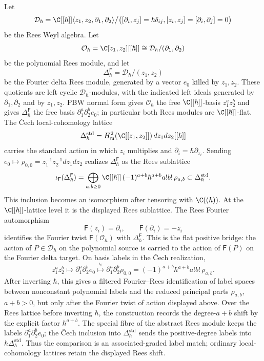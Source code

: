 \begin{thm}
\label{thm:app-matlis-rees-fourier-bridge}
  Let
  \[
    \mathcal D_\hbar
    =
    \C[[\hbar]]
      \langle z_1,z_2,\partial_1,\partial_2\rangle
      \big/
      \bigl([\partial_i,z_j]=\hbar\delta_{ij},
      [z_i,z_j]=[\partial_i,\partial_j]=0\bigr)
  \]
  be the Rees Weyl algebra.  Let
  \[
    \mathcal O_\hbar=\C[z_1,z_2][[\hbar]]
      \cong\mathcal D_\hbar/(\partial_1,\partial_2)
  \]
  be the polynomial Rees module, and let
  \[
    \Delta^{\mathsf F}_\hbar=
      \mathcal D_\hbar/(z_1,z_2)
  \]
  be the Fourier delta Rees module, generated by a vector \(e_0\)
  killed by \(z_1,z_2\).  These quotients are left cyclic
  \(\mathcal D_\hbar\)-modules, with the indicated left ideals
  generated by \(\partial_1,\partial_2\) and by \(z_1,z_2\). PBW normal
  form gives \(\mathcal O_\hbar\) the free \(\C[[\hbar]]\)-basis
  \(z_1^az_2^b\) and gives \(\Delta^{\mathsf F}_\hbar\) the free basis
  \(\partial_1^a\partial_2^b e_0\); in particular both Rees modules are
  \(\C[[\hbar]]\)-flat.  The \v{C}ech local-cohomology lattice
  \[
    \Delta^{\mathrm{std}}_\hbar=
    H^2_{\mathfrak m}(\C[[z_1,z_2]])\,dz_1dz_2[[\hbar]]
  \]
  carries the standard action in which \(z_i\) multiplies and
  \(\partial_i=\hbar\partial_{z_i}\).  Sending
  \(e_0\mapsto\rho_{0,0}=z_1^{-1}z_2^{-1}dz_1dz_2\) realizes
  \(\Delta^{\mathsf F}_\hbar\) as the Rees sublattice
  \[
    \iota_{\mathsf F}(\Delta^{\mathsf F}_\hbar)
    =
    \bigoplus_{a,b\geq0}
      \C[[\hbar]]\,
      (-1)^{a+b}\hbar^{a+b}a!b!\,\rho_{a,b}
    \subset
    \Delta^{\mathrm{std}}_\hbar .
  \]
  This inclusion becomes an isomorphism after tensoring with
  \(\C((\hbar))\).  At the \(\C[[\hbar]]\)-lattice level it is the
  displayed Rees sublattice.  The Rees Fourier
  automorphism
  \[
    \mathsf F(z_i)=\partial_i,\qquad
    \mathsf F(\partial_i)=-z_i
  \]
  identifies the Fourier twist \(\mathsf F(\mathcal O_\hbar)\) with
  \(\Delta^{\mathsf F}_\hbar\).  This is the flat positive bridge: the
  action of \(P\in\mathcal D_\hbar\) on the polynomial source is carried
  to the action of \(\mathsf F(P)\) on the Fourier delta target.  On basis
  labels in the \v{C}ech
  realization,
  \[
    z_1^az_2^b
    \longmapsto
    \partial_1^a\partial_2^b e_0
    \overset{\iota_{\mathsf F}}{\longmapsto}
    \partial_1^a\partial_2^b\rho_{0,0}
    =
    (-1)^{a+b}\hbar^{a+b}a!b!\,\rho_{a,b}.
  \]
  After inverting \(\hbar\), this gives a filtered Fourier--Rees
  identification of label spaces between nonconstant polynomial labels and
  the reduced principal parts \(\rho_{a,b}\), \(a+b>0\), but only after the
  Fourier twist of action displayed above.  Over the Rees lattice before
  inverting \(\hbar\), the construction records the degree-\(a+b\) shift
  by the explicit factor \(\hbar^{a+b}\).  The special fibre of the
  abstract Rees module keeps the labels
  \(\partial_1^a\partial_2^be_0\); the \v{C}ech inclusion into
  \(\Delta^{\mathrm{std}}_\hbar\) sends the positive-degree labels into
  \(\hbar\Delta^{\mathrm{std}}_\hbar\).  Thus the comparison is an
  associated-graded label match; ordinary local-cohomology lattices
  retain the displayed Rees shift.


\end{thm}
